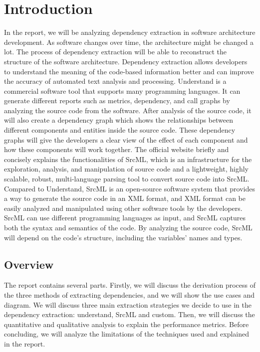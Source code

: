 \documentclass[12pt, dvipsnames, a4paper]{article}
\begin{document}
\section{Introduction}
In the report, we will be analyzing dependency extraction in software architecture development. As software changes over time, the architecture might be changed a lot. The process of dependency extraction will be able to reconstruct the structure of the software architecture. Dependency extraction allows developers to understand the meaning of the code-based information better and can improve the accuracy of automated text analysis and processing.
Understand is a commercial software tool that supports many programming languages. It can generate different reports such as metrics, dependency, and call graphs by analyzing the source code from the software. After analysis of the source code, it will also create a dependency graph which shows the relationships between different components and entities inside the source code. These dependency graphs will give the developers a clear view of the effect of each component and how these components will work together.
The official website briefly and concisely explains the functionalities of SrcML, which is an infrastructure for the exploration, analysis, and manipulation of source code and a lightweight, highly scalable, robust, multi-language parsing tool to convert source code into SrcML. Compared to Understand, SrcML is an open-source software system that provides a way to generate the source code in an XML format, and XML format can be easily analyzed and manipulated using other software tools by the developers. SrcML can use different programming languages as input, and SrcML captures both the syntax and semantics of the code. By analyzing the source code, SrcML will depend on the code's structure, including the variables' names and types.

\subsection{Overview}
The report contains several parts. Firstly, we will discuss the derivation process of the three methods of extracting dependencies, and we will show the use cases and diagram. We will discuss three main extraction strategies we decide to use in the dependency extraction: understand, SrcML and custom. Then, we will discuss the quantitative and qualitative analysis to explain the performance metrics. Before concluding, we will analyze the limitations of the techniques used and explained in the report.
\end{document}
